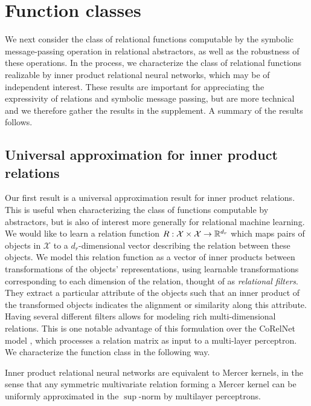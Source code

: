 \section{Function classes}
\label{ssec:function_classes_preview}

We next consider the class of relational functions computable by the symbolic message-passing operation in relational abstractors, as well as the robustness of these operations. In the process, we characterize the class of relational functions realizable by inner product relational neural networks, which may be of independent interest. These results are important for appreciating the expressivity of relations and symbolic message passing, but are more technical and we therefore gather the results in the supplement. A summary of the results follows.


\def\rdot{\bigcdot}
\def\F{{\mathfrak{F}}}
\def\MLP{\text{MLP}}

\subsection{Universal approximation for inner product relations}

Our first result is a universal approximation result for inner product relations. This is useful when characterizing the class of functions computable by abstractors, but is also of interest more generally for relational machine learning.
We would like to learn a relation function \(R: \mathcal{X} \times \mathcal{X} \to \mathbb{R}^{d_r}\) which maps pairs of objects in \(\mathcal{X}\) to a \(d_r\)-dimensional vector describing the relation between these objects. We model this relation function as a vector of inner products between transformations of the objects' representations,
using learnable transformations corresponding to each dimension of the relation, thought of as \textit{relational filters}. They extract a particular attribute of the objects such that an inner product of the transformed objects indicates the alignment or similarity along this attribute. Having several different filters allows for modeling rich multi-dimensional relations. This is one notable advantage of this formulation over the CoRelNet model \citep{kerg2022neural}, which processes a relation matrix as input to a multi-layer perceptron. We characterize the function class in the following way.

\begin{result}
    Inner product relational neural networks are equivalent to Mercer kernels, in the 
    sense that any symmetric multivariate relation forming a Mercer kernel can be 
    uniformly approximated in the $\sup$-norm by multilayer perceptrons.
\end{result}

